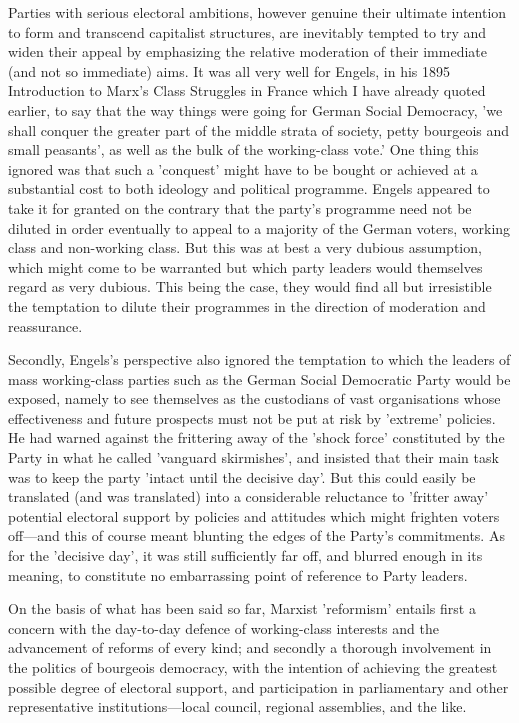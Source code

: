 Parties with serious electoral ambitions, however genuine their ultimate intention to form and transcend capitalist structures, are inevitably tempted to try and widen their appeal by emphasizing the relative moderation of their immediate (and not so immediate) aims. It was all very well for Engels, in his 1895 Introduction to Marx's Class Struggles in France which I have already quoted earlier, to say that the way things were going for German Social Democracy, 'we shall conquer the greater part of the middle strata of society, petty bourgeois and small peasants', as well as the bulk of the working-class vote.' One thing this ignored was that such a 'conquest' might have to be bought or achieved at a substantial cost to both ideology and political programme. Engels appeared to take it for granted on the contrary that the party's programme need not be diluted in order eventually to appeal to a majority of the German voters, working class and non-working class. But this was at best a very dubious assumption, which might come to be warranted but which party leaders would themselves regard as very dubious. This being the case, they would find all but irresistible the temptation to dilute their programmes in the direction of moderation and reassurance.

Secondly, Engels's perspective also ignored the temptation to which the leaders of mass working-class parties such as the German Social Democratic Party would be exposed, namely to see themselves as the custodians of vast organisations whose effectiveness and future prospects must not be put at risk by 'extreme' policies. He had warned against the frittering away of the 'shock force' constituted by the Party in what he called 'vanguard skirmishes', and insisted that their main task was to keep the party 'intact until the decisive day'. But this could easily be translated (and was translated) into a considerable reluctance to 'fritter away' potential electoral support by policies and attitudes which might frighten voters off—and this of course meant blunting the edges of the Party's commitments. As for the 'decisive day', it was still sufficiently far off, and blurred enough in its meaning, to constitute no embarrassing point of reference to Party leaders.

On the basis of what has been said so far, Marxist 'reformism' entails first a concern with the day-to-day defence of working\hyp{}class interests and the advancement of reforms of every kind; and secondly a thorough involvement in the politics of bourgeois democracy, with the intention of achieving the greatest possible degree of electoral support, and participation in parliamentary and other representative institutions—local council, regional assemblies, and the like.

